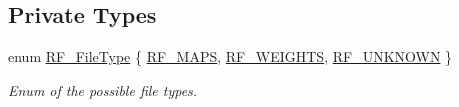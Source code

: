 \subsection*{Private Types}
\begin{DoxyCompactItemize}
\item 
enum \hyperlink{classns3_1_1RocketfuelTopologyReader_a04346285f097be349a70c57315a42415}{R\+F\+\_\+\+File\+Type} \{ \hyperlink{classns3_1_1RocketfuelTopologyReader_a04346285f097be349a70c57315a42415a845bfbcfcea49def2cce65b5e9c0c2f5}{R\+F\+\_\+\+M\+A\+PS}, 
\hyperlink{classns3_1_1RocketfuelTopologyReader_a04346285f097be349a70c57315a42415abed804021a51dbea02727a00544cbb75}{R\+F\+\_\+\+W\+E\+I\+G\+H\+TS}, 
\hyperlink{classns3_1_1RocketfuelTopologyReader_a04346285f097be349a70c57315a42415abcd0ab0e192c64ebc7684980f7455ec4}{R\+F\+\_\+\+U\+N\+K\+N\+O\+WN}
 \}\begin{DoxyCompactList}\small\item\em Enum of the possible file types. \end{DoxyCompactList}
\end{DoxyCompactItemize}
